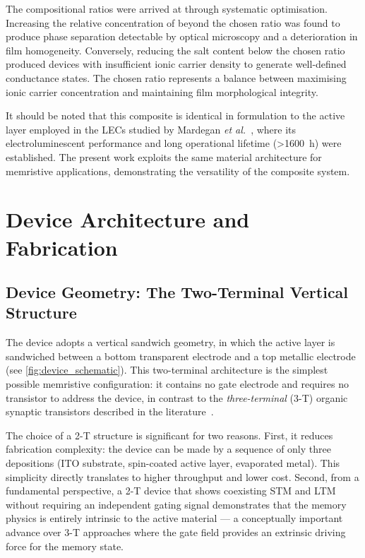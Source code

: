 \documentclass[12pt, a4paper, twoside]{report}
\newcommand{\LiTf}{\ce{LiCF3SO3}}
\newcommand{\twoterminal}{two-terminal}
\begin{document}
The compositional ratios were arrived at through systematic optimisation. Increasing the relative concentration of \LiTf{} beyond the chosen ratio was found to produce phase separation detectable by optical microscopy and a deterioration in film homogeneity. Conversely, reducing the salt content below the chosen ratio produced devices with insufficient ionic carrier density to generate well-defined conductance states. The chosen ratio represents a balance between maximising ionic carrier concentration and maintaining film morphological integrity.

It should be noted that this composite is identical in formulation to the active layer employed in the LECs studied by Mardegan \textit{et al.}~\cite{Mardegan2021}, where its electroluminescent performance and long operational lifetime (\SI{>1600}{\hour}) were established. The present work exploits the same material architecture for memristive applications, demonstrating the versatility of the composite system.


\section{Device Architecture and Fabrication}\label{sec:device_fab}

\subsection{Device Geometry: The Two-Terminal Vertical Structure}\label{subsec:device_geometry}

The device adopts a vertical sandwich geometry, in which the active layer is sandwiched between a bottom transparent electrode and a top metallic electrode (see \cref{fig:device_schematic}). This \twoterminal{} architecture is the simplest possible memristive configuration: it contains no gate electrode and requires no transistor to address the device, in contrast to the \textit{three-terminal} (3-T) organic synaptic transistors described in the literature~\cite{Gkoupidenis2015, Xu2016, Gkoupidenis2017}.

The choice of a 2-T structure is significant for two reasons. First, it reduces fabrication complexity: the device can be made by a sequence of only three depositions (ITO substrate, spin-coated active layer, evaporated metal). This simplicity directly translates to higher throughput and lower cost. Second, from a fundamental perspective, a 2-T device that shows coexisting STM and LTM without requiring an independent gating signal demonstrates that the memory physics is entirely intrinsic to the active material — a conceptually important advance over 3-T approaches where the gate field provides an extrinsic driving force for the memory state.
\end{document}
